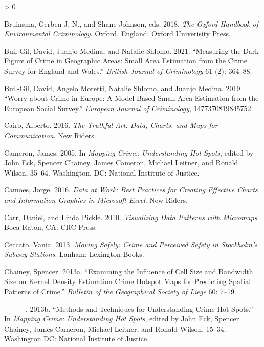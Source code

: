 \documentclass[
  krantz2]{krantz}
\newlength{\cslhangindent}
\newenvironment{CSLReferences}[2] %
 {%
  \setlength{\parindent}{0pt}
  \ifodd #1 \everypar{\setlength{\hangindent}{\cslhangindent}}\ignorespaces\fi
  \ifnum #2 > 0
  \setlength{\parskip}{#2\baselineskip}
  \fi
 }%
 {}
\begin{document}
\begin{CSLReferences}{1}{0}
\leavevmode\hypertarget{ref-Bruinsma_2018}{}%
Bruinsma, Gerben J. N., and Shane Johnson, eds. 2018. \emph{The Oxford Handbook of Environmental Criminology}. Oxford, England: Oxford Univerisity Press.

\leavevmode\hypertarget{ref-Buil-Gil_2021}{}%
Buil-Gil, David, Juanjo Medina, and Natalie Shlomo. 2021. {``Measuring the Dark Figure of Crime in Geographic Areas: Small Area Estimation from the Crime Survey for England and Wales.''} \emph{British Journal of Criminology} 61 (2): 364--88.

\leavevmode\hypertarget{ref-Buil_2019}{}%
Buil-Gil, David, Angelo Moretti, Natalie Shlomo, and Juanjo Medina. 2019. {``Worry about Crime in Europe: A Model-Based Small Area Estimation from the European Social Survey.''} \emph{European Journal of Criminology}, 1477370819845752.

\leavevmode\hypertarget{ref-Cairo_2016}{}%
Cairo, Alberto. 2016. \emph{The Truthful Art: Data, Charts, and Maps for Communication}. New Riders.

\leavevmode\hypertarget{ref-Cameron_2005}{}%
Cameron, James. 2005. In \emph{Mapping Crime: Understanding Hot Spots}, edited by John Eck, Spencer Chainey, James Cameron, Michael Leitner, and Ronald Wilson, 35--64. Washington, DC: National Institute of Justice.

\leavevmode\hypertarget{ref-Camoes_2016}{}%
Camoes, Jorge. 2016. \emph{Data at Work: Best Practices for Creating Effective Charts and Information Graphics in Microsoft Excel}. New Riders.

\leavevmode\hypertarget{ref-Carr_2010}{}%
Carr, Daniel, and Linda Pickle. 2010. \emph{Visualizing Data Patterns with Micromaps}. Boca Raton, CA: CRC Press.

\leavevmode\hypertarget{ref-Ceccato_2013}{}%
Ceccato, Vania. 2013. \emph{Moving Safely: Crime and Perceived Safety in Stockholm's Subway Stations}. Lanham: Lexington Books.

\leavevmode\hypertarget{ref-Chainey_2013a}{}%
Chainey, Spencer. 2013a. {``Examining the Influence of Cell Size and Bandwidth Size on Kernel Density Estimation Crime Hotspot Maps for Predicting Spatial Patterns of Crime.''} \emph{Bulletin of the Geographical Society of Liege} 60: 7--19.

\leavevmode\hypertarget{ref-Chainey_2013b}{}%
---------. 2013b. {``Methods and Techniques for Understanding Crime Hot Spots.''} In \emph{Mapping Crime: Understanding Hot Spots}, edited by John Eck, Spencer Chainey, James Cameron, Michael Leitner, and Ronald Wilson, 15--34. Washington DC: National Institute of Justice.


\end{CSLReferences}
\end{document}
